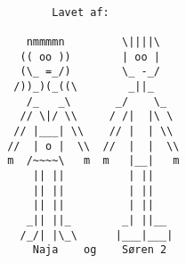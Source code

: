 \documentclass[10pt,a4paper,danish]{article}
\begin{document}
\begin{verbatim}

        Lavet af:

    nmmmmn         \||||\
   (( oo ))        | oo |
   (\_ =_/)        \_ -_/
  /))_)(_((\        _||_
    /_   _\       _/    \_
   // \|/ \\     / /|  |\ \
  // |___| \\    // |  | \\
 //  | o |  \\  //  |  |  \\
 m  /~~~~\   m  m   |__|   m
     || ||          | ||  
     || ||          | ||  
     || ||          | ||  
    _|| ||_        _| ||__
   /_/| |\_\      |___|___|
     Naja    og    Søren 2

\end{verbatim}
\end{document}
